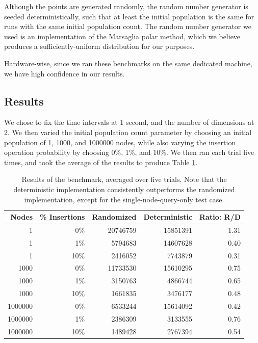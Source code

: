 \documentclass[12pt]{article}
\begin{document}
        Although the points are generated randomly, the random number generator is seeded deterministically, such that at least the initial population is the same for runs with the same initial population count. The random number generator we used is an implementation of the Marsaglia polar method, which we believe produces a sufficiently-uniform distribution for our purposes.
        
        Hardware-wise, since we ran these benchmarks on the same dedicated machine, we have high confidence in our results.
        
    \subsection{Results}
        We chose to fix the time intervals at 1 second, and the number of dimensions at 2. We then varied the initial population count parameter by choosing an initial population of 1, 1000, and 1000000 nodes, while also varying the insertion operation probability by choosing 0\%, 1\%, and 10\%. We then ran each trial five times, and took the average of the results to produce Table \ref{tbl:1}.
        
        \begin{table} [ht!]
        \centering
            \begin{tabular}{|r|r|r|r|r|}
            \hline
            \textbf{Nodes}& \textbf{\% Insertions}& \textbf{Randomized}& \textbf{Deterministic}& \textbf{Ratio: R/D}\\ \hline
            1       & 0\%           &    20746759 &    15851391    & 1.31       \\ \hline
            1       & 1\%           &    5794683  &    14607628    & 0.40       \\ \hline
            1       & 10\%          &    2416052  &    7743879     & 0.31       \\ \hline
            1000    & 0\%           &    11733530 &    15610295    & 0.75       \\ \hline
            1000    & 1\%           &    3150763  &    4866744     & 0.65       \\ \hline
            1000    & 10\%          &    1661835  &    3476177     & 0.48       \\ \hline
            1000000 & 0\%           &    6533244  &    15614092    & 0.42       \\ \hline
            1000000 & 1\%           &    2386309  &    3133555     & 0.76       \\ \hline
            1000000 & 10\%          &    1489428  &    2767394     & 0.54       \\ \hline
            \end{tabular}
            \label{tbl:1}
            \caption{Results of the benchmark, averaged over five trials. Note that the deterministic implementation consistently outperforms the randomized implementation, except for the single-node-query-only test case.}
        \end{table}
        
\end{document}
